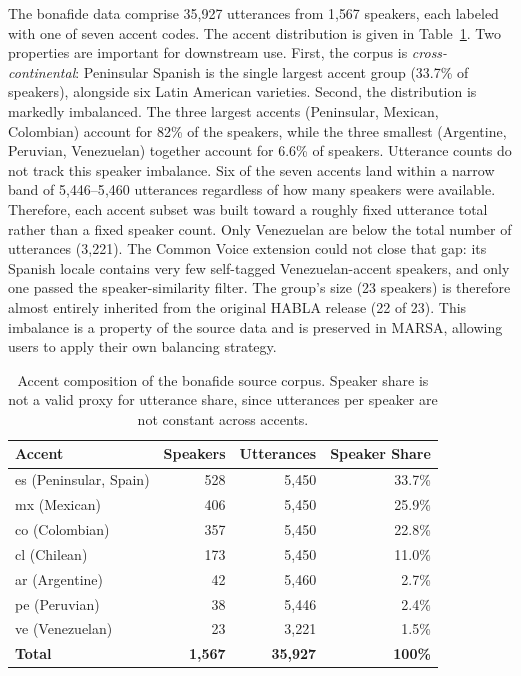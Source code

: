 \documentclass[11pt]{article}
\begin{document}
The bonafide data comprise 35{,}927 utterances from 1{,}567 speakers,
each labeled with one of seven accent codes. The accent distribution is
given in Table~\ref{tab:accents}. Two properties are important for
downstream use. First, the corpus is \emph{cross-continental}:
Peninsular Spanish is the single largest accent group
(33.7\% of speakers), alongside six Latin American varieties. Second,
the distribution is markedly imbalanced. The three largest accents
(Peninsular, Mexican, Colombian) account for 82\% of the speakers, while
the three smallest (Argentine, Peruvian, Venezuelan) together account
for 6.6\% of speakers. Utterance counts do not
track this speaker imbalance. Six of the seven accents land within a
narrow band of 5{,}446--5{,}460 utterances regardless of how many
speakers were available. Therefore, each accent subset was
built toward a roughly fixed utterance total rather than a fixed speaker
count. Only Venezuelan are below the total number of utterances (3{,}221). The Common Voice extension could not close that gap: its Spanish locale
contains very few self-tagged Venezuelan-accent speakers, and only one passed the
speaker-similarity filter. The group's size (23 speakers) is therefore
almost entirely inherited from the original HABLA release (22 of 23).
This imbalance is a property of the source data and is preserved in MARSA, allowing users to apply their own balancing
strategy.

\begin{table}[H]
\centering
\caption{Accent composition of the bonafide source corpus. Speaker share is not a valid proxy for
utterance share, since utterances per speaker are not constant across
accents.}
\label{tab:accents}
\small
\begin{tabular}{lrrr}
\toprule
\textbf{Accent} & \textbf{Speakers} & \textbf{Utterances} & \textbf{Speaker Share} \\
\midrule
es (Peninsular, Spain) & 528 & 5{,}450 & 33.7\% \\
mx (Mexican)           & 406 & 5{,}450 & 25.9\% \\
co (Colombian)         & 357 & 5{,}450 & 22.8\% \\
cl (Chilean)           & 173 & 5{,}450 & 11.0\% \\
ar (Argentine)         & 42  & 5{,}460 & 2.7\% \\
pe (Peruvian)          & 38  & 5{,}446 & 2.4\% \\
ve (Venezuelan)        & 23  & 3{,}221 & 1.5\% \\
\midrule
\textbf{Total}         & \textbf{1{,}567} & \textbf{35{,}927} & \textbf{100\%} \\
\bottomrule
\end{tabular}
\end{table}
\end{document}
